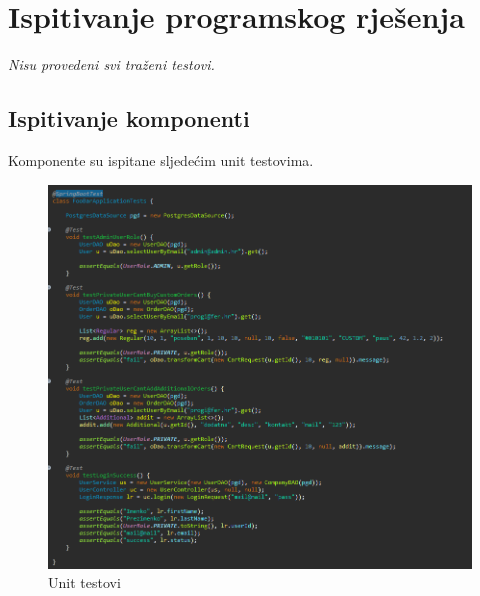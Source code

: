 			
			\eject 
		
	
		\section{Ispitivanje programskog rješenja}
			
			
			\textit {Nisu provedeni svi traženi testovi.}
			
			\subsection{Ispitivanje komponenti}
			Komponente su ispitane sljedećim unit testovima. 
			\begin{figure}[H]
				\includegraphics[scale=0.5]{slike/testovi.PNG} 
				\centering
				\caption{Unit testovi}
				\label{fig:unit}%
			\end{figure}
			
